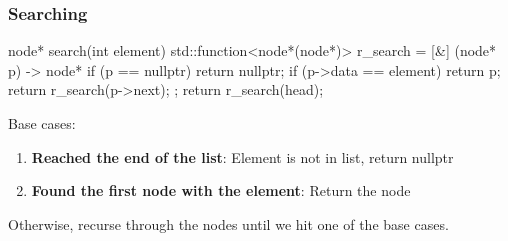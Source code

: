 \documentclass{report}
\begin{document}
\pagebreak 
\subsubsection{Searching}
\bigbreak \noindent 
\begin{cppcode}
    node* search(int element) {
        std::function<node*(node*)> r_search = [&] (node* p) -> node* {
            if (p == nullptr)  {
                return nullptr;
            }
            if (p->data == element) {
                return p;
            }
            return r_search(p->next);
        };
        return r_search(head);
    }
\end{cppcode}
\bigbreak \noindent 
Base cases:
\begin{enumerate}
    \item \textbf{Reached the end of the list}: Element is not in list, return nullptr
    \item \textbf{Found the first node with the element}: Return the node
\end{enumerate}
\bigbreak \noindent 
Otherwise, recurse through the nodes until we hit one of the base cases.


\pagebreak 
{}
\bigbreak \noindent 
\end{document}

